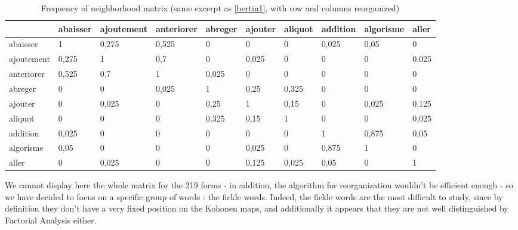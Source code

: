 \documentclass[runningheads,a4paper]{llncs}
\begin{document}
\begin{table}
\begin{tabular}{|l|l|l|l|l|l|l|l|l|l|}
\hline
 & abaisser & ajoutement & anteriorer& abreger & ajouter & aliquot & addition & algorisme & aller \\ \hline
abaisser  & \cellcolor{gris} 1 & \cellcolor{gris} 0,275 & \cellcolor{gris} 0,525 & 0 & 0 & 0 & \cellcolor{grisclair} 0,025 & \cellcolor{grisclair} 0,05 & 0 \\ \hline
ajoutement  & \cellcolor{gris} 0,275 & \cellcolor{gris} 1 & \cellcolor{gris} 0,7 & 0 & \cellcolor{grisclair} 0,025 & 0 & 0 & 0 & \cellcolor{grisclair} 0,025 \\ \hline
anteriorer & \cellcolor{gris} 0,525 & \cellcolor{gris} 0,7 & \cellcolor{gris} 1 & \cellcolor{grisclair} 0,025 & 0 & 0 & 0 & 0 & 0 \\ \hline
abreger & 0 & 0 &\cellcolor{grisclair} 0,025& \cellcolor{gris} 1 & \cellcolor{gris} 0,25 & \cellcolor{gris} 0,325 & 0 & 0 & 0 \\ \hline
ajouter & 0 & \cellcolor{grisclair} 0,025 & 0& \cellcolor{gris} 0,25 & \cellcolor{gris} 1 & \cellcolor{grisclair} 0,15 & 0 & \cellcolor{grisclair} 0,025 & \cellcolor{grisclair} 0,125 \\ \hline
aliquot & 0 & 0 & 0& \cellcolor{gris} 0,325 & \cellcolor{grisclair} 0,15 & \cellcolor{gris} 1 & 0 & 0 & \cellcolor{grisclair} 0,025 \\ \hline
addition & \cellcolor{grisclair} 0,025 & 0 & 0& 0 & 0 & 0 & \cellcolor{gris} 1 & \cellcolor{gris} 0,875 & \cellcolor{grisclair} 0,05 \\ \hline
algorisme & \cellcolor{grisclair} 0,05 & 0 & 0& 0 & \cellcolor{grisclair} 0,025 & 0 & \cellcolor{gris} 0,875 & \cellcolor{gris} 1 & 0 \\ \hline
aller & 0 & \cellcolor{grisclair} 0,025 & 0& 0 & \cellcolor{grisclair} 0,125 & \cellcolor{grisclair} 0,025 & \cellcolor{grisclair} 0,05 & 0 & \cellcolor{gris} 1 \\ \hline
\end{tabular}

\label{bertin2}
\caption{Frequency of neighborhood matrix (same excerpt as \ref{bertin1}, with row and columns reorganized)}
\end{table}

We cannot display here the whole matrix for the 219 forms - in addition, the algorithm for reorganization wouldn't be efficient enough - so we have decided to focus on a specific group of words : the fickle words. Indeed, the fickle words are the most difficult to study, since by definition they don't have a very fixed position on the Kohonen maps, and additionally it appears that they are not well distinguished by Factorial Analysis either.
\end{document}
